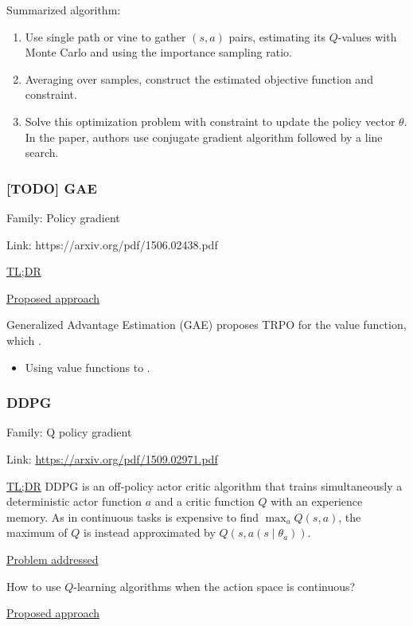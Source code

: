 \documentclass[12pt, english]{article}
\begin{document}
Summarized algorithm:

\begin{enumerate}
  \item Use single path or vine to gather $(s,a)$ pairs, estimating its $Q$-values with Monte Carlo and using the importance sampling ratio.
  \item Averaging over samples, construct the estimated objective function and constraint.
  \item Solve this optimization problem with constraint to update the policy vector $\theta$. In the paper, authors use conjugate gradient algorithm followed by a line search.
\end{enumerate}


\subsubsection{[TODO] GAE}
\label{GAE}

Family: Policy gradient

Link: https://arxiv.org/pdf/1506.02438.pdf

\underline{TL;DR}


\underline{Proposed approach}

Generalized Advantage Estimation (GAE) proposes TRPO for the value function, which .

\begin{itemize}
  \item Using value functions to .
\end{itemize}


\subsubsection{DDPG}
\label{DDPG}

Family: Q policy gradient

Link: \url{https://arxiv.org/pdf/1509.02971.pdf}

\underline{TL;DR}
DDPG \cite{lillicrap_continuous_2015} is an off-policy actor critic algorithm that trains simultaneously a deterministic actor function $a$ and a critic function $Q$ with an experience memory. As in continuous tasks is expensive to find $\max_a Q(s,a)$, the maximum of $Q$ is instead approximated by $Q(s, a(s \mid \theta_a))$.

\underline{Problem addressed}

How to use $Q$-learning algorithms when the action space is continuous?

\underline{Proposed approach}
\end{document}
